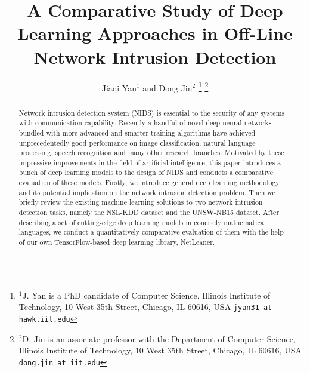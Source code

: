 \documentclass[letterpaper, 10 pt, conference]{ieeeconf}  %
\title{\LARGE \bf
A Comparative Study of Deep Learning Approaches in Off-Line Network Intrusion Detection
}
\author{Jiaqi Yan$^{1}$ and Dong Jin$^{2}$%
\thanks{$^{1}$J. Yan is a PhD candidate of Computer Science,
        Illinois Institute of Technology, 10 West 35th Street, Chicago, IL 60616, USA
        {\tt\small jyan31 at hawk.iit.edu}}%
\thanks{$^{2}$D. Jin is an associate professor with the Department of Computer Science,
		Illinois Institute of Technology,
        10 West 35th Street, Chicago, IL 60616, USA
        {\tt\small dong.jin at iit.edu}}%
}
\begin{document}
\maketitle
\thispagestyle{empty}
\pagestyle{empty}


\begin{abstract}
Network intrusion detection system (NIDS) is essential to the security of any systems with communication capability.
Recently a handful of novel deep neural networks bundled with more advanced and smarter
training algorithms have achieved unprecedentedly good performance on image classification,
natural language processing, speech recognition and many other research branches.
Motivated by these impressive improvements in the field of artificial intelligence,
this paper introduces a bunch of deep learning models to the design of NIDS
and conducts a comparative evaluation of these models.
Firstly, we introduce general deep learning methodology and its potential implication on the
network intrusion detection problem.
Then we briefly review the existing machine learning solutions to two network intrusion detection tasks, namely the NSL-KDD dataset and the UNSW-NB15 dataset.
After describing a set of cutting-edge deep learning models in concisely mathematical languages,
we conduct a quantitatively comparative evaluation of them with the help of
our own TensorFlow-based deep learning library, NetLeaner.
\end{abstract}












\end{document}
